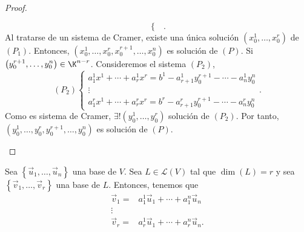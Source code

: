 \begin{proof}
\begin{description}
\[\begin{cases}
\end{cases}
.\]
Al tratarse de un sistema de Cramer, existe una única solución $\displaystyle \left(x^{1}_{0}, \ldots, x^{r}_{0}\right) $ de $\displaystyle \left(P_{1}\right) $. Entonces, $\displaystyle \left(x^{1}_{0}, \ldots, x^{r}_{0}, x^{r+1}_{0}, \ldots, x^{n}_{0}\right) $ es solución de $\displaystyle \left(P\right) $. Si $\displaystyle \left(y^{r+1}_{0}, \ldots, y^{n}_{0}\right)\in\K^{n-r} $. Consideremos el sistema $\displaystyle \left(P_{2}\right) $,
\[\left(P_{2}\right)
\begin{cases}
a^{1}_{1}x^{1}+\cdots + a^{1}_{r}x^{r} = b^{1}-a^{1}_{r+1}y^{r+1}_{0}-\cdots-a^{1}_{n}y^{n}_{0}\\
\vdots \\
a^{r}_{1}x^{1} + \cdots + a^{r}_{r}x^{r} = b^{r}-a^{r}_{r+1}y^{r+1}_{0} - \cdots - a^{r}_{n}y^{n}_{0}
\end{cases}
.\]
Como es sistema de Cramer, $\displaystyle \exists!\left(y^{1}_{0}, \ldots, y^{r}_{0}\right) $ solución de $\displaystyle \left(P_{2}\right) $. Por tanto, $\displaystyle \left(y^{1}_{0}, \ldots, y^{r}_{0}, y^{r+1}_{0}, \ldots, y^{n}_{0}\right) $ es solución de $\displaystyle \left(P\right) $.
\end{description}
\end{proof}

Sea $\displaystyle \left\{ \vec{u}_{1}, \ldots, \vec{u}_{n}\right\}  $ una base de $\displaystyle V $. Sea $\displaystyle L \in \mathcal{L}\left(V\right) $ tal que $\displaystyle \dim\left(L\right)= r $ y sea $\displaystyle \left\{ \vec{v}_{1}, \ldots, \vec{v}_{r}\right\}  $ una base de $\displaystyle L $. Entonces, tenemos que
\[
\begin{split}
	\vec{v}_{1} = & a^{1}_{1}\vec{u}_{1} + \cdots + a^{n}_{1}\vec{u}_{n} \\
	\vdots & \\
	\vec{v}_{r} = & a^{1}_{r}\vec{u}_{1} + \cdots + a^{n}_{r}\vec{u}_{n}.
\end{split}
\]

